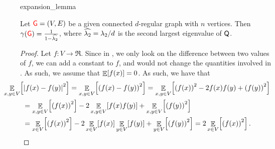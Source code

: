 \begin{fragment}{expansion_lemma}
\begin{lemma}
    Let ${\textcolor{red}{\mathsf{G}}}=(V,E)$ be a given connected $d$-regular graph with $n$
    vertices. Then $\DialX{\Graph} = \frac{1}{1-\SEVN}$, where
    $\widehat{\lambda_2}=\lambda_2/d$ is the second largest eigenvalue of $\mathsf{Q}$.

\end{lemma}
\end{fragment}

\begin{proof}
    Let $f:V\rightarrow \Re$. Since in , we only look
    on the difference between two values of $f$, we can add a constant
    to $f$, and would not change the quantities involved in
    . As such, we assume that $\mathop{\mathbb{E}}\!\left[ {f(x)} \right]=0$. As such,
    we have that
    \begin{align}
        \eqlab{reduction:1} &\hspace{-1cm} \ExExt{x,y \in
           V}{\cardin{f(x)- f(y)}^2} = \ExExt{x,y \in V}{\pth[]{f(x)-
              f(y)}^2} =%
        \ExExt{x,y \in V}{\pth[]{f(x)}^2 -2 f(x) f(y) + \pth{f(y)}^2}
        \\
        &=%
        \ExExt{x,y \in V}{\pth[]{f(x)}^2} -2 \ExExt{x,y \in V}{ f(x)
           f(y)}
        + \ExExt{x,y \in V}{\pth[]{f(y)}^2}    
        \nonumber\\
        \nonumber
        &=%
        \ExExt{x \in V}{\pth[]{f(x)}^2} -2 \ExExt{x \in V}{ f(x)}
        \ExExt{y \in V}{f(y)}
        + \ExExt{y \in V}{\pth[]{f(y)}^2}    
        = 2 \ExExt{x \in V}{\pth[]{f(x)}^2}.
    \end{align}
    

\end{proof}
